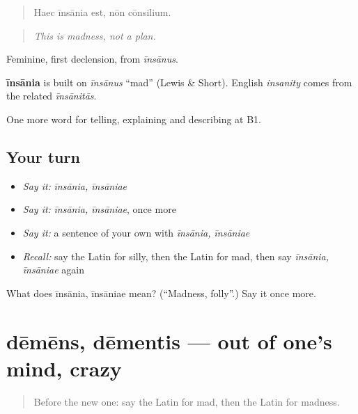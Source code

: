 \begin{quote}
Haec īnsānia est, nōn cōnsilium.
\end{quote}

\begin{quote}
\emph{This is madness, not a plan.}
\end{quote}

Feminine, first declension, from \emph{īnsānus}.

\begin{cousinweb}
\textbf{īnsānia} is built on \emph{īnsānus} \textquotedblleft{}mad\textquotedblright{} (Lewis \& Short). English \emph{insanity} comes from the related \emph{īnsānitās}.
\end{cousinweb}

\begin{grammarlens}[title={What you've built}]
One more word for telling, explaining and describing at B1.
\end{grammarlens}

\subsection*{Your turn}
\begin{itemize}
\raggedright
  \item \emph{Say it:} \emph{īnsānia, īnsāniae}
  \item \emph{Say it:} \emph{īnsānia, īnsāniae}, once more
  \item \emph{Say it:} a sentence of your own with \emph{īnsānia, īnsāniae}
  \item \emph{Recall:} say the Latin for silly, then the Latin for mad, then say \emph{īnsānia, īnsāniae} again
\end{itemize}

\begin{tcolorbox}[breakable,colback=teal!4,colframe=teal!35!black,title={Before you move on}]
What does īnsānia, īnsāniae mean? (\textquotedblleft{}Madness, folly\textquotedblright{}.) Say it once more.
\end{tcolorbox}
\section[dēmēns, dēmentis]{dēmēns, dēmentis — out of one's mind, crazy}

\label{lesson:LA-C510-demens}



\begin{quote}
Before the new one: say the Latin for mad, then the Latin for madness.
\end{quote}

